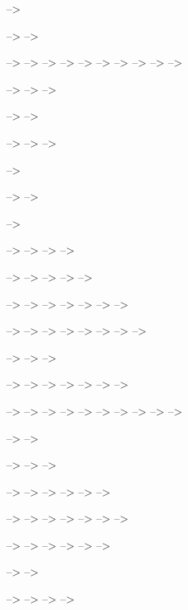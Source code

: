 \documentclass[12pt,twoside,openany]{reedthesis}
\begin{document}
--\textgreater{}

--\textgreater{} --\textgreater{}

--\textgreater{} --\textgreater{} --\textgreater{} --\textgreater{}
--\textgreater{} --\textgreater{} --\textgreater{} --\textgreater{}
--\textgreater{} --\textgreater{}

--\textgreater{} --\textgreater{} --\textgreater{}

--\textgreater{} --\textgreater{}

--\textgreater{} --\textgreater{} --\textgreater{}

--\textgreater{}

--\textgreater{} --\textgreater{}

--\textgreater{}

--\textgreater{} --\textgreater{} --\textgreater{} --\textgreater{}

--\textgreater{} --\textgreater{} --\textgreater{} --\textgreater{}
--\textgreater{}

--\textgreater{} --\textgreater{} --\textgreater{} --\textgreater{}
--\textgreater{} --\textgreater{} --\textgreater{}

--\textgreater{} --\textgreater{} --\textgreater{} --\textgreater{}
--\textgreater{} --\textgreater{} --\textgreater{} --\textgreater{}

--\textgreater{} --\textgreater{} --\textgreater{}

--\textgreater{} --\textgreater{} --\textgreater{} --\textgreater{}
--\textgreater{} --\textgreater{} --\textgreater{}

--\textgreater{} --\textgreater{} --\textgreater{} --\textgreater{}
--\textgreater{} --\textgreater{} --\textgreater{} --\textgreater{}
--\textgreater{} --\textgreater{}

--\textgreater{} --\textgreater{}

--\textgreater{} --\textgreater{} --\textgreater{}

--\textgreater{} --\textgreater{} --\textgreater{} --\textgreater{}
--\textgreater{} --\textgreater{}

--\textgreater{} --\textgreater{} --\textgreater{} --\textgreater{}
--\textgreater{} --\textgreater{} --\textgreater{}

--\textgreater{} --\textgreater{} --\textgreater{} --\textgreater{}
--\textgreater{} --\textgreater{}

--\textgreater{} --\textgreater{}

--\textgreater{} --\textgreater{} --\textgreater{} --\textgreater{}
\end{document}
